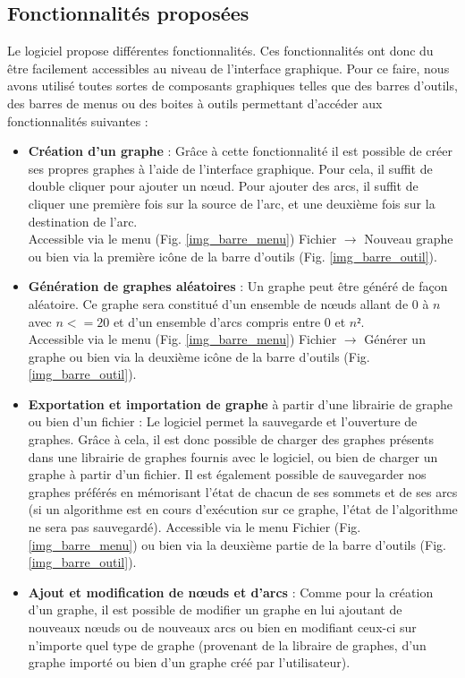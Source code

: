 \documentclass[11pt,a4paper]{article}
\begin{document}
		\subsection{Fonctionnalités proposées}
			Le logiciel propose différentes fonctionnalités. Ces fonctionnalités ont donc du être facilement accessibles au niveau de l'interface graphique. Pour ce faire, nous avons utilisé toutes sortes de composants graphiques telles que des barres d'outils, des barres de menus ou des boites à outils permettant d'accéder aux fonctionnalités suivantes :
			\begin{itemize}
				\item \textbf{Création d'un graphe} : Grâce à cette fonctionnalité il est possible de créer ses propres graphes à l'aide de l'interface graphique. Pour cela, il suffit de double cliquer pour ajouter un n\oe ud. Pour ajouter des arcs, il suffit de cliquer une première fois sur la source de l'arc, et une deuxième fois sur la destination de l'arc. \\
				Accessible via le menu (Fig. \ref{img_barre_menu}) Fichier $\rightarrow$ Nouveau graphe ou bien via la première icône de la barre d'outils (Fig. \ref{img_barre_outil}).
				\item \textbf{Génération de graphes aléatoires }: Un graphe peut être généré de façon aléatoire. Ce graphe sera constitué d'un ensemble de n\oe uds allant de 0 à $n$ avec $n <= 20$ et d'un ensemble d'arcs compris entre 0 et $n²$.\\
				Accessible via le menu (Fig. \ref{img_barre_menu}) Fichier $\rightarrow$ Générer un graphe ou bien via la deuxième icône de la barre d'outils (Fig. \ref{img_barre_outil}).
				\item \textbf{Exportation et importation de graphe }à partir d'une librairie de graphe ou bien d'un fichier : Le logiciel permet la sauvegarde et l'ouverture de graphes. Grâce à cela, il est donc possible de charger des graphes présents dans une librairie de graphes fournis avec le logiciel, ou bien de charger un graphe à partir d'un fichier. Il est également possible de sauvegarder nos graphes préférés en mémorisant l'état de chacun de ses sommets et de ses arcs (si un algorithme est en cours d'exécution sur ce graphe, l'état de l'algorithme ne sera pas sauvegardé).
				Accessible via le menu Fichier (Fig. \ref{img_barre_menu}) ou bien via la deuxième partie de la barre d'outils (Fig. \ref{img_barre_outil}).
				\item \textbf{Ajout et modification de n\oe uds et d'arcs }: Comme pour la création d'un graphe, il est possible de modifier un graphe en lui ajoutant de nouveaux n\oe uds ou de nouveaux arcs ou bien en modifiant ceux-ci sur n'importe quel type de graphe (provenant de la libraire de graphes, d'un graphe importé ou bien d'un graphe créé par l'utilisateur).\\

\end{itemize}
\end{document}

